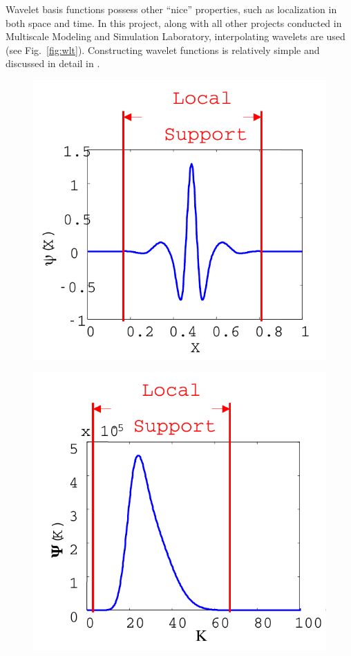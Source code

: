 Wavelet basis functions possess other ``nice'' properties, such as localization in both space and time. In this project, along with all other projects conducted in Multiscale Modeling and Simulation Laboratory, interpolating wavelets are used (see Fig.~\ref{fig:wlt}). Constructing wavelet functions is relatively simple and discussed in detail in \cite{lib:wlt_home}.

\begin{figure}[t]
\begin{minipage}{0.5\linewidth}
\includegraphics[scale=0.7]{fig/wlt.pdf}\\
\end{minipage}
\begin{minipage}{0.5\linewidth}
\includegraphics[scale=0.7]{fig/wlt_fft.pdf}\\

\end{minipage}
\end{figure}
